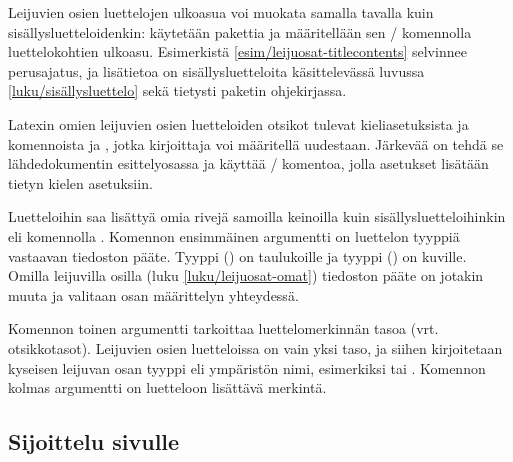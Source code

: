 Leijuvien osien luettelojen ulkoasua voi muokata samalla tavalla kuin
sisällysluetteloidenkin: käytetään pakettia  ja
määritellään sen \-/ komennolla luettelokohtien
ulkoasu. Esimerkistä \ref{esim/leijuosat-titlecontents} selvinnee
perusajatus, ja lisätietoa on sisällysluetteloita käsittelevässä luvussa
\ref{luku/sisällysluettelo} sekä tietysti paketin ohjekirjassa.

Latexin omien leijuvien osien luetteloiden otsikot tulevat
kieliasetuksista ja komennoista  ja
, jotka kirjoittaja voi määritellä uudestaan.
Järkevää on tehdä se lähdedokumentin esittelyosassa ja käyttää
\-/ komentoa, jolla asetukset lisätään tietyn kielen
asetuksiin.

\begin{koodilohkosis}
\addto{\captionsfinnish}{
  \renewcommand{\listtablename}{Taulukkoluettelo}
  \renewcommand{\listfigurename}{Kuvaluettelo}
}
\end{koodilohkosis}

\noindent
Luetteloihin saa lisättyä omia rivejä samoilla keinoilla kuin
sisällysluetteloihinkin eli komennolla .
Komennon ensimmäinen argumentti on luettelon tyyppiä vastaavan tiedoston
pääte. Tyyppi  () on taulukoille ja
tyyppi  () on kuville. Omilla
leijuvilla osilla (luku \ref{luku/leijuosat-omat}) tiedoston pääte on
jotakin muuta ja valitaan osan määrittelyn yhteydessä.

\begin{koodilohkosis}
\end{koodilohkosis}

\noindent
Komennon toinen argumentti tarkoittaa luettelomerkinnän tasoa (vrt.
otsikkotasot). Leijuvien osien luetteloissa on vain yksi taso, ja siihen
kirjoitetaan kyseisen leijuvan osan tyyppi eli ympäristön nimi,
esimerkiksi  tai . Komennon kolmas
argumentti on luetteloon lisättävä merkintä.

\subsection{Sijoittelu sivulle}
\label{luku/leijuosat-sijoittelu}


